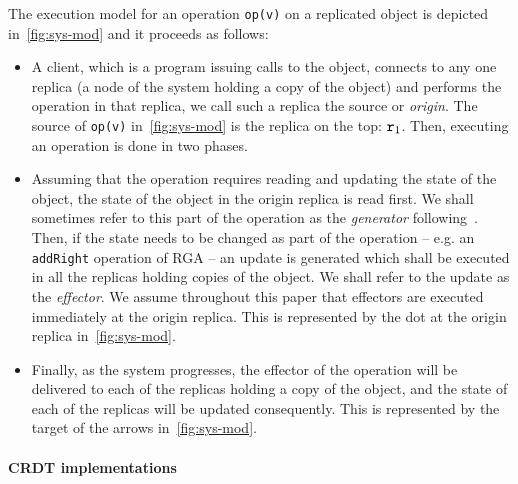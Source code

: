 The execution model for an operation \lstinline|op(v)| on a replicated
object is depicted in~\autoref{fig:sys-mod} and it proceeds as follows:
\begin{itemize}
\item A client, which is a program issuing calls to the object, connects
  to any one replica (a node of the system holding a copy of the object)
  and performs the operation in that replica, we call such a
  replica the source or \emph{origin}. The source of \lstinline|op(v)|
  in~\autoref{fig:sys-mod} is the replica on the top: $\mathtt{r}_1$.
  Then, executing an operation is done in two phases.
\item Assuming that the operation requires reading and updating the
  state of the object, the state of the object in the origin replica is
  read first.
  We shall sometimes refer to this part of the operation as the
  \emph{generator} following~\cite{ShapiroPBZ11}.
  Then, if the state needs to be changed as part of the operation --
  e.g. an \lstinline|addRight| operation of RGA -- an update is
  generated which shall be executed in all the replicas holding copies of the
  object.
  We shall refer to the update as the \emph{effector}.
  We assume throughout this paper that effectors are executed
  immediately at the origin replica.
  This is represented by the dot at the origin replica
  in~\autoref{fig:sys-mod}.
\item Finally, as the system progresses, the effector of the operation
  will be delivered to each of the replicas holding a copy of the
  object, and the state of each of the replicas will be updated
  consequently.
  This is represented by the target of the arrows
  in~\autoref{fig:sys-mod}.
\end{itemize}

\paragraph{CRDT implementations}

